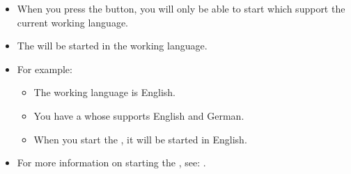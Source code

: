 
\begin{itemize}
\item When you press the  button, you will only be able to start \gdauts{} which support the current working language.
\item The \gdaut will be started in the working language.
\item For example:
\begin{itemize}
\item The working language is English.
\item You have a \gdsuite whose \gdaut supports English and German.
\item When you start the \gdaut, it will be started in English.
\end{itemize}
\item For more information on starting the \gdaut{}, see: . 
\end{itemize}
